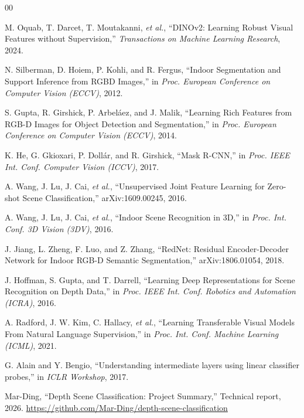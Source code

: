 \documentclass[conference, a4paper]{IEEEtran}
\begin{document}
\begin{thebibliography}{00}

M. Oquab, T. Darcet, T. Moutakanni, \textit{et al.},
``DINOv2: Learning Robust Visual Features without Supervision,''
\textit{Transactions on Machine Learning Research}, 2024.

N. Silberman, D. Hoiem, P. Kohli, and R. Fergus,
``Indoor Segmentation and Support Inference from RGBD Images,''
in \textit{Proc. European Conference on Computer Vision (ECCV)}, 2012.

S. Gupta, R. Girshick, P. Arbel{\'a}ez, and J. Malik,
``Learning Rich Features from RGB-D Images for Object Detection and Segmentation,''
in \textit{Proc. European Conference on Computer Vision (ECCV)}, 2014.

K. He, G. Gkioxari, P. Doll{\'a}r, and R. Girshick,
``Mask R-CNN,''
in \textit{Proc. IEEE Int. Conf. Computer Vision (ICCV)}, 2017.

A. Wang, J. Lu, J. Cai, \textit{et al.},
``Unsupervised Joint Feature Learning for Zero-shot Scene Classification,''
arXiv:1609.00245, 2016.

A. Wang, J. Lu, J. Cai, \textit{et al.},
``Indoor Scene Recognition in 3D,''
in \textit{Proc. Int. Conf. 3D Vision (3DV)}, 2016.

J. Jiang, L. Zheng, F. Luo, and Z. Zhang,
``RedNet: Residual Encoder-Decoder Network for Indoor RGB-D Semantic Segmentation,''
arXiv:1806.01054, 2018.

J. Hoffman, S. Gupta, and T. Darrell,
``Learning Deep Representations for Scene Recognition on Depth Data,''
in \textit{Proc. IEEE Int. Conf. Robotics and Automation (ICRA)}, 2016.

A. Radford, J. W. Kim, C. Hallacy, \textit{et al.},
``Learning Transferable Visual Models From Natural Language Supervision,''
in \textit{Proc. Int. Conf. Machine Learning (ICML)}, 2021.

G. Alain and Y. Bengio,
``Understanding intermediate layers using linear classifier probes,''
in \textit{ICLR Workshop}, 2017.

Mar-Ding,
``Depth Scene Classification: Project Summary,''
Technical report, 2026.
\url{https://github.com/Mar-Ding/depth-scene-classification}

\end{thebibliography}
\end{document}
